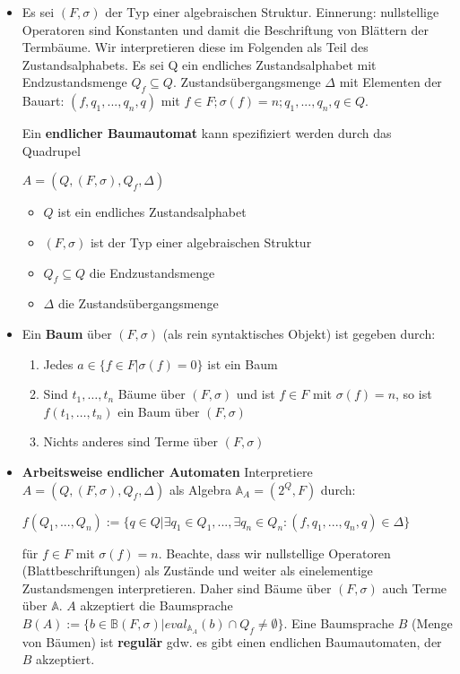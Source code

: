 \documentclass[12pt, a4paper]{article}
\begin{document}
\begin{itemize}
		\item Es sei $(F,\sigma)$ der Typ einer algebraischen Struktur.
			\subitem Einnerung: nullstellige Operatoren sind Konstanten und damit die Beschriftung von Blättern der Termbäume.
			\subitem Wir interpretieren diese im Folgenden als Teil des Zustandsalphabets.
			\subitem Es sei Q ein endliches Zustandsalphabet mit Endzustandsmenge $Q_{f}\subseteq Q$.
			\subitem Zustandsübergangsmenge $\Delta$ mit Elementen der Bauart:
			$(f,q_{1},...,q_{n},q)$ mit $f\in F; \sigma(f)=n; q_{1},...,q_{n}, q\in Q.$
			
			\subitem Ein \textbf{endlicher Baumautomat} kann spezifiziert werden durch das Quadrupel 
			\begin{center} $A=(Q,(F,\sigma),Q_{f},\Delta)$ \end{center}
			\begin{itemize}
				\item $Q$ ist ein endliches Zustandsalphabet
				\item $(F,\sigma)$ ist der Typ einer algebraischen Struktur
				\item $Q_{f}\subseteq Q$ die Endzustandsmenge
				\item $\Delta$ die Zustandsübergangsmenge 
			\end{itemize}
		
		\item Ein \textbf{Baum} über $(F,\sigma)$ (als rein syntaktisches Objekt) ist gegeben durch:
		\begin{enumerate}
			\item Jedes $a\in\{f\in F|\sigma(f)=0\}$ ist ein Baum
			\item Sind $t_{1},\dots,t_{n}$ Bäume über $(F,\sigma)$ und ist $f\in F$ mit $\sigma(f)=n$, so ist	$f(t_{1},\dots,t_{n})$ ein Baum über $(F,\sigma)$
			\item Nichts anderes sind Terme über $(F,\sigma)$
		\end{enumerate} 
	
		\item \textbf{Arbeitsweise endlicher Automaten}
			\subitem Interpretiere $A = (Q, (F ,\sigma),Q_{f},\Delta)$ als Algebra $\mathbb{A}_{A} = (2^{Q},F)$ durch:
			\begin{center}
				$f(Q_{1},...,Q_{n}):=\{q\in Q|\exists q_{1}\in Q_{1},...,\exists q_{n}\in Q_{n}:(f,q_{1},...,q_{n},q)\in\Delta\}$
			\end{center}			
			\subitem für $f\in F$ mit $\sigma(f)=n$.
			\subitem Beachte, dass wir nullstellige Operatoren (Blattbeschriftungen) als Zustände und weiter als einelementige Zustandsmengen interpretieren.
			\subitem Daher sind Bäume über $(F,\sigma)$ auch Terme über $\mathbb{A}$.
			\subitem $A$ akzeptiert die Baumsprache $B(A):=\{b\in\mathbb{B}(F,\sigma)|eval_{\mathbb{A}_{A}}(b)\cap Q_{f}\neq\emptyset\}$.
			\subitem Eine Baumsprache $B$ (Menge von Bäumen) ist \textbf{regulär} gdw. es gibt einen endlichen Baumautomaten, der $B$ akzeptiert.
			

\end{itemize}
\end{document}
